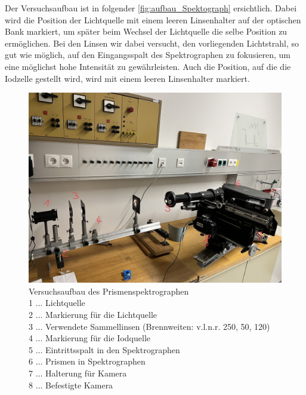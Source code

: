 \documentclass[12pt,english,ngerman]{scrartcl}
\begin{document}
Der Versuchsaufbau ist in folgender \autoref{fig:aufbau_Spektograph}
ersichtlich. Dabei wird die Position der Lichtquelle mit einem leeren
Linsenhalter auf der optischen Bank markiert, um später beim Wechsel der
Lichtquelle die selbe Position zu ermöglichen. Bei den Linsen wir dabei
versucht, den vorliegenden Lichtstrahl, so gut wie möglich, auf den
Eingangsspalt des Spektrographen zu fokusieren, um eine möglichst hohe
Intensität zu gewährleisten. Auch die Position, auf die die Iodzelle gestellt
wird, wird mit einem leeren Linsenhalter markiert.

\begin{figure}[H]
	\begin{center}
		\includegraphics[width =\textwidth]{./figures/Spektograph.png}
	\end{center}
	\caption[Versuchsaufbau des Prismenspektrographen] {Versuchsaufbau des
		Prismenspektrographen                                                    \\
		1 \(\dots\) Lichtquelle                                                  \\
		2 \(\dots\) Markierung für die Lichtquelle                               \\
		3 \(\dots\) Verwendete Sammellinsen (Brennweiten: v.l.n.r. 250, 50, 120) \\
		4 \(\dots\) Markierung für die Iodquelle                                 \\
		5 \(\dots\) Eintrittsspalt in den Spektrographen                         \\
		6 \(\dots\) Prismen in Spektrographen                                    \\
		7 \(\dots\) Halterung für Kamera                                         \\
		8 \(\dots\) Befestigte Kamera
	}\label{fig:aufbau_Spektograph}
\end{figure}
\end{document}
